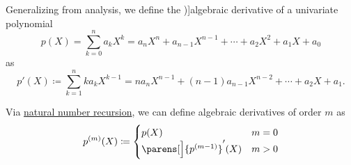 \begin{definition}\label{def:algebraic_derivative}
  Generalizing  from analysis, we define the \term[ru=(алгебрическая) производная (\cite[sec. D17.1]{Тыртышников2007ЛинейнаяАлгебра})]{algebraic derivative} of a univariate polynomial
  \begin{equation*}
    p(X) = \sum_{k=0}^n a_k X^k = a_n X^n + a_{n-1} X^{n-1} + \cdots + a_2 X^2 + a_1 X + a_0
  \end{equation*}
  as
  \begin{equation*}
    p'(X) \coloneqq \sum_{k=1}^n k a_k X^{k-1} = n a_n X^{n-1} + (n-1) a_{n-1} X^{n-2} + \cdots + a_2 X + a_1.
  \end{equation*}

  Via \hyperref[rem:natural_number_recursion]{natural number recursion}, we can define algebraic derivatives of order \( m \) as
  \begin{equation*}
    p^{(m)}(X) \coloneqq \begin{cases}
      p(X)              &m = 0 \\
      \parens[\Big]{ p^{(m - 1)} }'(X) &m > 0
    \end{cases}
  \end{equation*}
\end{definition}

